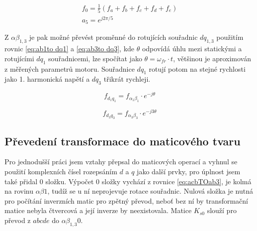 \begin{equation}   
    \label{eq:acbTOab3}
    \begin{gathered}
        f_0=\frac{1}{5}\left( f_a +f_b+f_c+f_d+f_e\right)\\
a_5=e^{j2\pi/5}
\end{gathered}
\end{equation}


Z  $\alpha \beta _{1,3}$ je pak možné převést proměnné do rotujících souřadnic $dq_{1,3}$ použitím rovnic \ref{eq:ab1to dq1} a \ref{eq:ab3to dq3}, kde $\theta$ odpovídá úhlu mezi statickými a rotujícími $dq_1$ souřadnicemi, lze spočítat jako $\theta= \omega_{fr} \cdot t $, většinou je aproximován z měřených parametrů motoru. Souřadnice $dq_1$ rotují potom na stejné rychlosti jako 1. harmonická napětí a $dq_3$ třikrát rychleji.\cite{analyseOfMultiphase} \cite{letadla}

\begin{equation}
    \label{eq:ab1to dq1}
    f_{d_1 q_1}= f_{\alpha_1 \beta_1} \cdot e^{-j\theta}
\end{equation}


\begin{equation}
    \label{eq:ab3to dq3}
    f_{d_3 q_3}= f_{\alpha_3 \beta_3} \cdot e^{-j3\theta}
\end{equation}

\subsection{Převedení transformace do maticového tvaru}
Pro jednodušší práci jsem vztahy přepsal do maticových operací a vyhnul se použití komplexních čísel rozepsáním $d$ a $q$  jako další prvky, pro úplnost jsem také přidal 0 složku. Výpočet 0 složky vychází z rovnice \ref{eq:acbTOab3}, je kolmá na rovinu $\alpha \beta1$, tudíž se u ní neprojevuje rotace souřadnic. Nulová složka je nutná pro počítání inverzních matic pro zpětný převod, neboť bez ní by transformační matice nebyla čtvercová a její inverze by neexistovala. Matice $K_{s0}$ slouží pro převod z $abcde$ do $\alpha \beta _{1,3}0$. 



